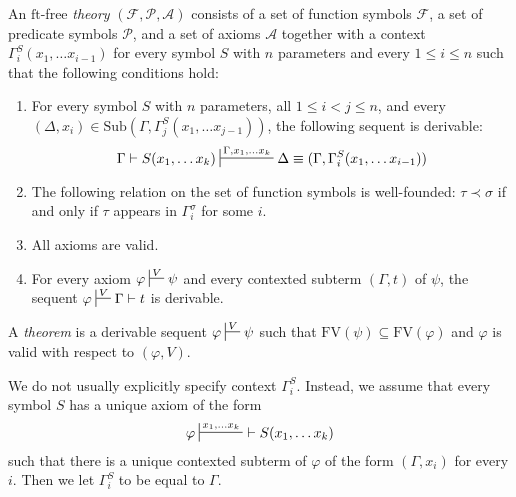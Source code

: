 \documentclass[reqno]{amsart}
\theoremstyle{definition}
\theoremstyle{remark}
\newcommand{\fs}[1]{\mathrm{#1}}
\newcommand{\FV}{\fs{FV}}
\newcommand{\ft}{\fs{ft}}
\newcommand{\sub}{\fs{Sub}}
\numberwithin{figure}{section}
\begin{document}
\begin{defn}[ft-free]
An $\ft$-free \emph{theory} $(\mathcal{F},\mathcal{P},\mathcal{A})$ consists of a set of function symbols $\mathcal{F}$, a set of predicate symbols $\mathcal{P}$, and a set of axioms $\mathcal{A}$
together with a context $\Gamma^S_i(x_1, \ldots x_{i-1})$ for every symbol $S$ with $n$ parameters and every $1 \leq i \leq n$ such that the following conditions hold:
\begin{enumerate}
\item \label{it:ax-consist} For every symbol $S$ with $n$ parameters, all $1 \leq i < j \leq n$, and every $(\Delta,x_i) \in \sub(\Gamma, \Gamma_j^S(x_1, \ldots x_{j-1}))$, the following sequent is derivable:
\[ \Gamma \vdash S(x_1, \ldots x_k) \sststile{}{\Gamma, x_1, \ldots x_k} \Delta \equiv (\Gamma, \Gamma_i^S(x_1, \ldots x_{i-1})) \]
\item \label{it:ax-wf} The following relation on the set of function symbols is well-founded: $\tau \prec \sigma$ if and only if $\tau$ appears in $\Gamma^\sigma_i$ for some $i$.
\item \label{it:ax-valid} All axioms are valid.
\item \label{it:ax-cond} For every axiom $\varphi \sststile{}{V} \psi$ and every contexted subterm $(\Gamma,t)$ of $\psi$, the sequent $\varphi \sststile{}{V} \Gamma \vdash t$ is derivable.
\end{enumerate}
A \emph{theorem} is a derivable sequent $\varphi \sststile{}{V} \psi$ such that $\FV(\psi) \subseteq \FV(\varphi)$ and $\varphi$ is valid with respect to $(\varphi,V)$.
\end{defn}

We do not usually explicitly specify context $\Gamma^S_i$.
Instead, we assume that every symbol $S$ has a unique axiom of the form
\[ \varphi \sststile{}{x_1, \ldots x_k}\ \vdash S(x_1, \ldots x_k) \]
such that there is a unique contexted subterm of $\varphi$ of the form $(\Gamma,x_i)$ for every $i$.
Then we let $\Gamma^S_i$ to be equal to $\Gamma$.
\end{document}
